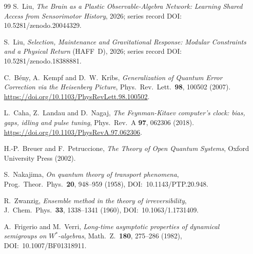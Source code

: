 \documentclass[12pt]{article}
\theoremstyle{definition}
\theoremstyle{remark}
\begin{document}
\begin{thebibliography}{99}
S.~Liu, \emph{The Brain as a Plastic Observable-Algebra Network:
Learning Shared Access from Sensorimotor History}, 2026; series record DOI: 10.5281/zenodo.20044329.

S.~Liu, \emph{Selection, Maintenance and Gravitational Response: Modular Constraints and a Physical Return} (HAFF~D), 2026;
series record DOI: 10.5281/zenodo.18388881.

C.~B\'eny, A.~Kempf and D.~W.~Kribs,
\emph{Generalization of Quantum Error Correction via the Heisenberg Picture},
Phys.\ Rev.\ Lett.\ \textbf{98}, 100502 (2007).
\url{https://doi.org/10.1103/PhysRevLett.98.100502}.

L.~Caha, Z.~Landau and D.~Nagaj,
\emph{The Feynman-Kitaev computer's clock: bias, gaps, idling and pulse tuning},
Phys.\ Rev.\ A \textbf{97}, 062306 (2018).
\url{https://doi.org/10.1103/PhysRevA.97.062306}.

H.-P.~Breuer and F.~Petruccione,
\emph{The Theory of Open Quantum Systems},
Oxford University Press (2002).

S.~Nakajima,
\emph{On quantum theory of transport phenomena},
Prog.\ Theor.\ Phys.\ \textbf{20}, 948--959 (1958),
DOI:~10.1143/PTP.20.948.

R.~Zwanzig,
\emph{Ensemble method in the theory of irreversibility},
J.\ Chem.\ Phys.\ \textbf{33}, 1338--1341 (1960),
DOI:~10.1063/1.1731409.

A.~Frigerio and M.~Verri,
\emph{Long-time asymptotic properties of dynamical semigroups on \(W^*\)-algebras},
Math.\ Z.\ \textbf{180}, 275--286 (1982),
DOI:~10.1007/BF01318911.

\end{thebibliography}
 
\end{document}
